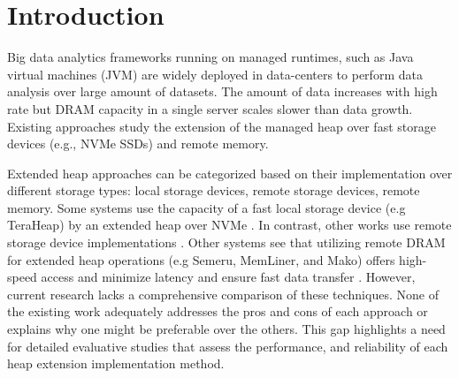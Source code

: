 \section{Introduction}
Big data analytics frameworks running on managed runtimes, such as Java virtual
machines (JVM) are widely deployed in data-centers to perform data analysis over
large amount of datasets. The amount of data increases with high rate but DRAM
capacity in a single server scales slower than data growth. Existing approaches
study the extension of the managed heap over fast storage devices (e.g., NVMe
SSDs) and remote memory.


 Extended heap approaches can be categorized based on their implementation over
different storage types: local storage devices, remote storage devices, remote
memory. Some systems use the capacity of a fast local storage device (e.g
TeraHeap) by an extended heap over NVMe . In contrast, other works use remote
storage device implementations . Other systems see that utilizing remote DRAM for
extended heap operations (e.g Semeru, MemLiner, and Mako) offers high-speed
access and minimize latency and ensure fast data transfer . However, current
research lacks a comprehensive comparison of these techniques. None of the
existing work adequately addresses the pros and cons of each approach or
explains why one might be preferable over the others. This gap highlights a need
for detailed evaluative studies that assess the performance, and reliability of
each heap extension implementation method.

